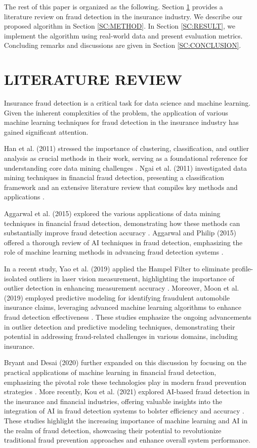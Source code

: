 \documentclass[12pt]{article}
\begin{document}
The rest of this paper is organized as the following. Section
\ref{SC:LR} provides a literature review on fraud detection in the
insurance industry. We describe our proposed algorithm in Section
\ref{SC:METHOD}. In Section \ref{SC:RESULT}, we implement the
algorithm using real-world data and present evaluation metrics.
Concluding remarks and discussions are given in Section
\ref{SC:CONCLUSION}.


\section{LITERATURE REVIEW}\label{SC:LR}
Insurance fraud detection is a critical task for data science and
machine learning. Given the inherent complexities of the problem,
the application of various machine learning techniques for fraud
detection in the insurance industry has gained significant
attention.

Han et al. (2011) stressed the importance of clustering,
classification, and outlier analysis as crucial methods in their
work, serving as a foundational reference for understanding core
data mining challenges \cite{A71}. Ngai et al. (2011) investigated
data mining techniques in financial fraud detection, presenting a
classification framework and an extensive literature review that
compiles key methods and applications \cite{A76}.

Aggarwal et al. (2015) explored the various applications of data
mining techniques in financial fraud detection, demonstrating how
these methods can substantially improve fraud detection accuracy
\cite{A70}. Aggarwal and Philip (2015) offered a thorough review
of AI techniques in fraud detection, emphasizing the role of
machine learning methods in advancing fraud detection systems
\cite{A74}.

In a recent study, Yao et al. (2019) applied the Hampel Filter to
eliminate profile-isolated outliers in laser vision measurement,
highlighting the importance of outlier detection in enhancing
measurement accuracy \cite{A80}. Moreover, Moon et al. (2019)
employed predictive modeling for identifying fraudulent automobile
insurance claims, leveraging advanced machine learning algorithms
to enhance fraud detection effectiveness \cite{A80}. These studies
emphasize the ongoing advancements in outlier detection and
predictive modeling techniques, demonstrating their potential in
addressing fraud-related challenges in various domains, including
insurance.


Bryant and Desai (2020) further expanded on this discussion by
focusing on the practical applications of machine learning in
financial fraud detection, emphasizing the pivotal role these
technologies play in modern fraud prevention strategies
\cite{A75}. More recently, Kou et al. (2021) explored AI-based
fraud detection in the insurance and financial industries,
offering valuable insights into the integration of AI in fraud
detection systems to bolster efficiency and accuracy \cite{A78}.
These studies highlight the increasing importance of machine
learning and AI in the realm of fraud detection, showcasing their
potential to revolutionize traditional fraud prevention approaches
and enhance overall system performance.
\end{document}
